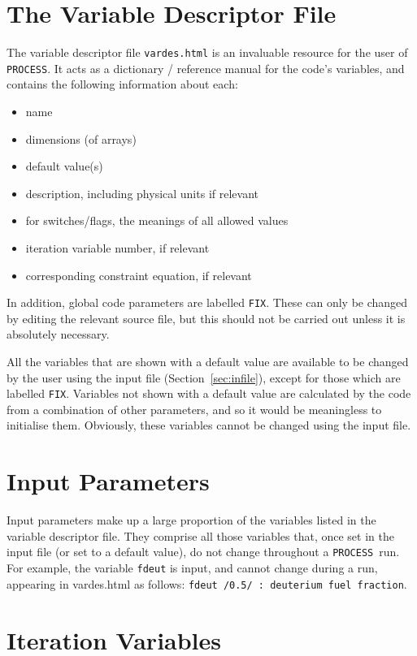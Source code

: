 \documentclass[11pt,a4paper]{report}
\newcommand{\process}{\mbox{\texttt{PROCESS}}}
\begin{document}
\section{The Variable Descriptor File}
\label{sec:vardes}

The variable descriptor file \texttt{vardes.html} is an invaluable resource for
the user of \process. It acts as a dictionary / reference manual for the
code's variables, and contains the following information about each:
\begin{itemize}
\item name
\item dimensions (of arrays)
\item default value(s)
\item description, including physical units if relevant
\item for switches/flags, the meanings of all allowed values
\item iteration variable number, if relevant
\item corresponding constraint equation, if relevant
\end{itemize}
In addition, global code parameters are labelled \texttt{FIX}. These can only
be changed by editing the relevant source file, but this should not be carried
out unless it is absolutely necessary.

All the variables that are shown with a default value are available to be
changed by the user using the input file (Section~\ref{sec:infile}), except
for those which are labelled \texttt{FIX}. Variables not shown with a default
value are calculated by the code from a combination of other parameters, and
so it would be meaningless to initialise them.  Obviously, these variables
cannot be changed using the input file.

\section{Input Parameters}
\label{sec:inpars}

Input parameters make up a large proportion of the variables listed in the
variable descriptor file. They comprise all those variables that, once set in
the input file (or set to a default value), do not change
throughout a \process\ run. For example, the variable \texttt{fdeut} is input, and cannot change during a run, appearing in vardes.html as follows: \texttt{fdeut /0.5/ : deuterium fuel fraction}.

\section{Iteration Variables}
\label{sec:itvars}
\end{document}
